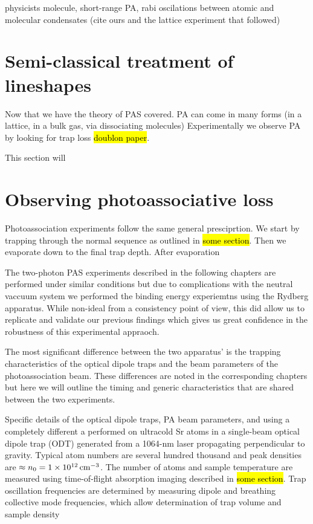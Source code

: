 physicists molecule, short-range PA, rabi oscilations between atomic and molecular condensates (cite ours and the lattice experiment that followed)

\section{Semi-classical treatment of lineshapes}
\label{sec:bohn_and_julienne}

Now that we have the theory of PAS covered. PA can come in many forms (in a lattice, in a bulk gas, via dissociating molecules) Experimentally we observe PA by looking for trap loss \hl{doublon paper}.

This section will 

\section{Observing photoassociative loss}
\label{sec:pa_methods}

Photoassociation experiments follow the same general presciprtion. We start by trapping through the normal sequence as outlined in \hl{some section}. Then we evaporate down to the final trap depth. After evaporation 

The two-photon PAS experiments described in the following chapters are performed under similar conditions but due to complications with the neutral vaccuum system we performed the binding energy experiemtns using the Rydberg apparatus. While non-ideal from a consistency point of view, this did allow us to replicate and validate our previous findings which gives us great confidence in the robustness of this experimental appraoch. 

The most significant difference between the two apparatus' is the trapping characteristics of the optical dipole traps and the beam parameters of the photoassociation beam. These differences are noted in the corresponding chapters but here we will outline the timing and generic characteristics that are shared between the two experiments. 

Specific details of the optical dipole traps, PA beam parameters, and using a completely different a  performed on ultracold Sr atoms in a single-beam optical dipole trap (ODT) generated from a 1064-nm laser propagating perpendicular to gravity. Typical atom numbers are several hundred thousand and peak densities are $\approx n_0 = 1 \times 10^{12} \, \text{cm}^{-3}$. The number of atoms and sample temperature are measured using time-of-flight absorption imaging described in \hl{some section}. Trap oscillation frequencies are determined by measuring dipole and breathing collective mode frequencies, which allow determination of trap volume and sample density



